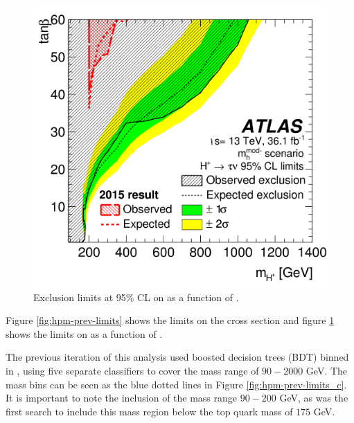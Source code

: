 		\begin{figure}[!ht]
			\centering
			\includegraphics[width=0.75\linewidth]{chapters/chapter2_theory/images/Previous_Limits_Combined_tanb.png}
			\caption{\label{fig:hpm-prev-limits-tanb} Exclusion limits at 95\% CL on \tanb as a function of \mHpm \cite{hpm-previous}. }
		\end{figure}
		Figure \ref{fig:hpm-prev-limits} shows the limits on the cross section and figure \ref{fig:hpm-prev-limits-tanb} shows the limits on \tanb as a function of \mHpm. 

		The previous iteration of this analysis used boosted decision trees (BDT) binned in \mHpm, using five separate classifiers to cover the mass range of $90 - 2000$ GeV. The mass bins can be seen as the blue dotted lines in Figure \ref{fig:hpm-prev-limits_c}. It is important to note the inclusion of the mass range $90 - 200$ GeV, as \cite{hpm-previous} was the first search to include this mass region below the top quark mass of $175$ GeV.